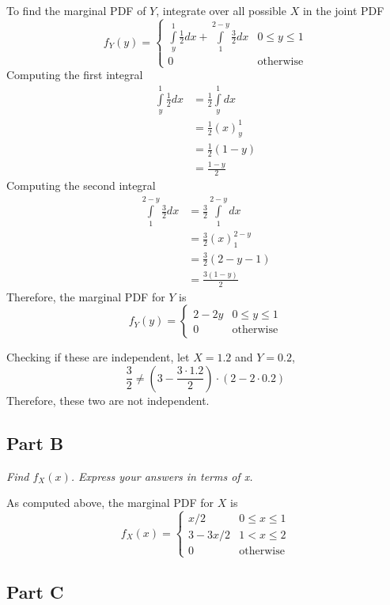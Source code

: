 \documentclass{article}
\begin{document}
To find the marginal PDF of $Y$, integrate over all possible $X$ in the joint
PDF
$$ f_Y(y) = \begin{cases}
    \int\limits_y^1 \frac{1}{2} dx + \int\limits_1^{2 - y} \frac{3}{2} dx & 0 \leq y \leq 1 \\
    0 & \mathrm{otherwise}
\end{cases} $$
Computing the first integral
\begin{align*}
    \int\limits_y^1 \frac{1}{2} dx &= \frac{1}{2} \int\limits_y^1 dx \\
    &= \frac{1}{2} \left( x \right)_y^1 \\
    &= \frac{1}{2} \left( 1 - y \right) \\
    &= \frac{1 - y}{2}
\end{align*}
Computing the second integral
\begin{align*}
    \int\limits_1^{2-y} \frac{3}{2} dx &= \frac{3}{2} \int\limits_1^{2-y} dx \\
    &= \frac{3}{2} \left( x \right)_1^{2-y} \\
    &= \frac{3}{2} \left( 2 - y - 1 \right) \\
    &= \frac{3 (1 - y)}{2}
\end{align*}
Therefore, the marginal PDF for $Y$ is
$$ f_Y(y) = \begin{cases}
    2 - 2y & 0 \leq y \leq 1 \\
    0 & \mathrm{otherwise}
\end{cases} $$

Checking if these are independent, let $X = 1.2$ and $Y = 0.2$,
$$ \frac{3}{2} \neq \left(3 - \frac{3 \cdot 1.2}{2}\right) \cdot \left(2 - 2
\cdot 0.2 \right) $$
Therefore, these two are not independent.

\subsection*{Part B}

\textit{Find $ f_X(x) $. Express your answers in terms of x.}

\bigbreak

As computed above, the marginal PDF for $X$ is
$$ f_X(x) = \begin{cases}
    x / 2 & 0 \leq x \leq 1 \\
    3 - 3x / 2 & 1 < x \leq 2 \\
    0 & \mathrm{otherwise}
\end{cases} $$

\subsection*{Part C}
\end{document}
